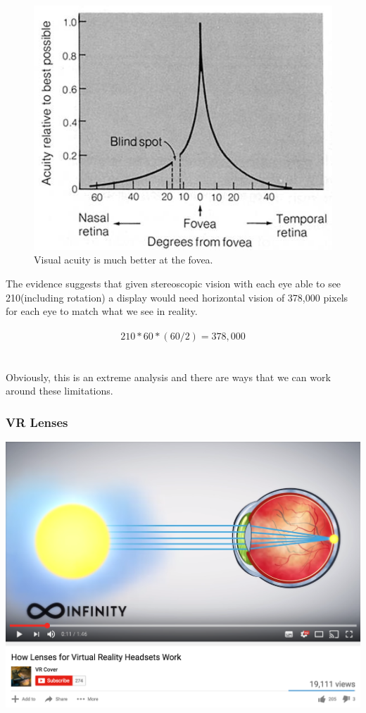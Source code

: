 \begin{frame}
	\begin{figure}
		\includegraphics[scale=.9]{assets/acuity} 
		\caption{Visual acuity is much better at the fovea.}
	\end{figure}
\end{frame}

\begin{frame}
	The evidence suggests that given stereoscopic vision with each eye able to see 210\degree (including rotation) a display would need horizontal vision of 378,000 pixels for each eye to match what we see in reality. \\~\\
	\[ 210 * 60 * (60/2) = 378,000 \] \\~\\
	
	Obviously, this is an extreme analysis and there are ways that we can work around these limitations. 
\end{frame}

\begin{frame}
	\frametitle{VR Lenses}
	\begin{center}
		\href{https://www.youtube.com/watch?v=NCBEYaC876A}{ \includegraphics[scale=.3]{assets/lenses}  }
	\end{center}
\end{frame}

